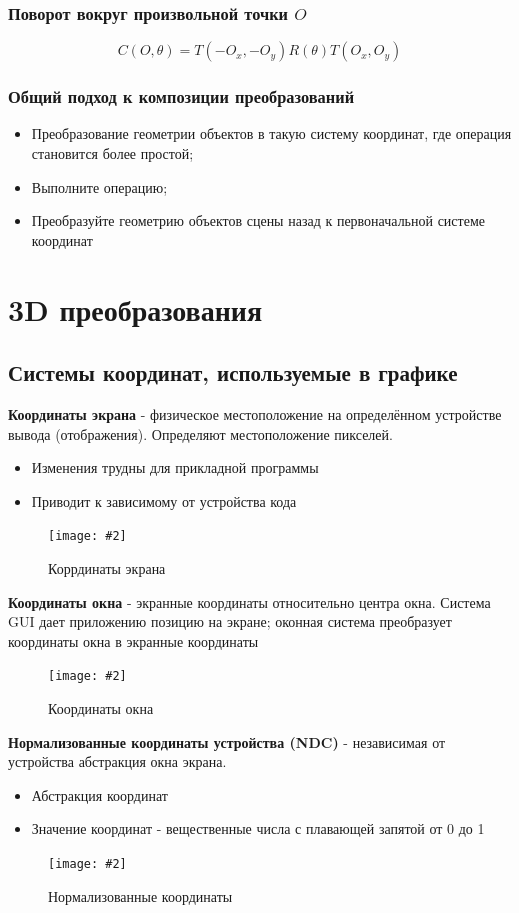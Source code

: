 \documentclass[a4paper, 14pt]{extarticle}
\newcommand{\definition}[1]{\textbf{#1}}
\newcommand{\screenshot}[3]{
	\begin{figure}[h]
		\centering
		\texttt{[image: \#2]}
		\caption{#3}
	\end{figure}
}
\begin{document}
\subsubsection{Поворот вокруг произвольной точки $O$}
$$
C(O, \theta) = T(-O_x, -O_y)R(\theta)T(O_x, O_y)
$$

\subsubsection{Общий подход к композиции преобразований}
\begin{itemize}
	\item Преобразование геометрии объектов в такую систему координат, где операция становится более простой;
	\item Выполните операцию;
	\item Преобразуйте геометрию объектов сцены назад к первоначальной системе координат
\end{itemize}

\section{3D преобразования}
\subsection{Системы координат, используемые в графике}
\definition{Координаты экрана} - физическое местоположение на определённом устройстве вывода (отображения). Определяют местоположение пикселей.
\begin{itemize}
	\item Изменения трудны для прикладной программы
	\item Приводит к зависимому от устройства кода
\end{itemize}
\screenshot{width=8cm}{l4/S001.jpg}{Коррдинаты экрана}

\definition{Координаты окна} - экранные координаты относительно центра окна.
Система GUI дает приложению позицию на экране; оконная система преобразует координаты окна в экранные координаты
\screenshot{width=8cm}{l4/S002.jpg}{Координаты окна}

\definition{Нормализованные координаты устройства (NDC)} - независимая от устройства абстракция окна экрана.
\begin{itemize}
	\item Абстракция координат
	\item Значение координат - вещественные числа с плавающей запятой от 0 до 1
\end{itemize}
\screenshot{width=8cm}{l4/S003.jpg}{Нормализованные координаты}
\end{document}
